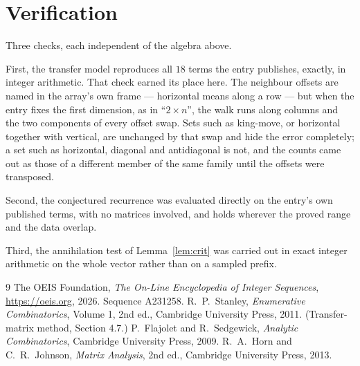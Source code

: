 \documentclass[11pt,a4paper]{article}
\theoremstyle{plain}
\theoremstyle{definition}
\begin{document}
\section{Verification}

Three checks, each independent of the algebra above.

First, the transfer model reproduces all $18$ terms the entry publishes, exactly, in
integer arithmetic. That check earned its place here. The neighbour offsets are named in the
array's own frame --- horizontal means along a row --- but when the entry fixes the first
dimension, as in ``$2\times n$'', the walk runs along columns and the two components of every
offset swap. Sets such as king-move, or horizontal together with vertical, are unchanged by
that swap and hide the error completely; a set such as horizontal, diagonal and antidiagonal
is not, and the counts came out as those of a different member of the same family until the
offsets were transposed.

Second, the conjectured recurrence was evaluated directly on the entry's own published terms,
with no matrices involved, and holds wherever the proved range and the data overlap.

Third, the annihilation test of Lemma~\ref{lem:crit} was carried out in exact integer
arithmetic on the whole vector rather than on a sampled prefix.

\begin{thebibliography}{9}
 The OEIS Foundation, \emph{The On-Line Encyclopedia of Integer
Sequences}, \url{https://oeis.org}, 2026. Sequence A231258.
 R.~P.~Stanley, \emph{Enumerative Combinatorics}, Volume 1, 2nd ed.,
Cambridge University Press, 2011. (Transfer-matrix method, Section 4.7.)
 P.~Flajolet and R.~Sedgewick, \emph{Analytic Combinatorics}, Cambridge
University Press, 2009.
 R.~A.~Horn and C.~R.~Johnson, \emph{Matrix Analysis}, 2nd ed., Cambridge
University Press, 2013.
\end{thebibliography}
\end{document}
